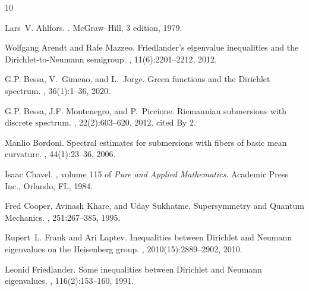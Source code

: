 \documentclass{amsart}
\theoremstyle{definition}
\theoremstyle{remark}
\numberwithin{equation}{section}
\begin{document}
\def\cprime{$'$} \def\polhk#1{\setbox0=\hbox{#1}{\ooalign{\hidewidth \lower1.5ex\hbox{`}\hidewidth\crcr\unhbox0}}} \def\polhk#1{\setbox0=\hbox{#1}{\ooalign{\hidewidth \lower1.5ex\hbox{`}\hidewidth\crcr\unhbox0}}} \def\polhk#1{\setbox0=\hbox{#1}{\ooalign{\hidewidth \lower1.5ex\hbox{`}\hidewidth\crcr\unhbox0}}} \def\cprime{$'$} \def\cprime{$'$} \def\cprime{$'$} \def\cprime{$'$} \def\cprime{$'$}
\begin{thebibliography}{10}

Lars~V. Ahlfors.
.
\newblock McGraw--Hill, 3 edition, 1979.

Wolfgang Arendt and Rafe Mazzeo.
\newblock Friedlander's eigenvalue inequalities and the {D}irichlet-to-{N}eumann semigroup.
, 11(6):2201--2212, 2012.

G.P. Bessa, V.~Gimeno, and L.~Jorge.
\newblock Green functions and the Dirichlet spectrum.
, 36(1):1--36, 2020.

G.P. Bessa, J.F. Montenegro, and P.~Piccione.
\newblock Riemannian submersions with discrete spectrum.
, 22(2):603--620, 2012.
\newblock cited By 2.

Manlio Bordoni.
\newblock Spectral estimates for submersions with fibers of basic mean curvature.
, 44(1):23--36, 2006.

Isaac Chavel.
, volume 115 of {\em Pure and Applied Mathematics}.
\newblock Academic Press Inc., Orlando, FL, 1984.

Fred Cooper, Avinash Khare, and Uday Sukhatme.
\newblock Supersymmetry and Quantum Mechanics.
, 251:267--385, 1995.

Rupert~L. Frank and Ari Laptev.
\newblock Inequalities between {D}irichlet and {N}eumann eigenvalues on the {H}eisenberg group.
, 2010(15):2889--2902, 2010.

Leonid Friedlander.
\newblock Some inequalities between Dirichlet and Neumann eigenvalues.
, 116(2):153--160, 1991.


\end{thebibliography}
\end{document}
